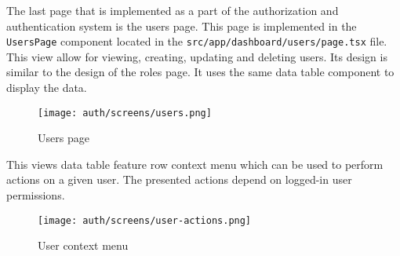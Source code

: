 \documentclass[../main.tex]{subfiles}
\begin{document}
The last page that is implemented as a part of the authorization and authentication system is the users page.
This page is implemented in the \texttt{UsersPage} component located in the \texttt{src/app/dashboard/users/page.tsx} file.
This view allow for viewing, creating, updating and deleting users.
Its design is similar to the design of the roles page. It uses the same data table component to display the data.

\begin{figure}[H]
  \centering
  \texttt{[image: auth/screens/users.png]}
  \caption{Users page}
\end{figure}

This views data table feature row context menu which can be used to perform actions on a given user.
The presented actions depend on logged-in user permissions.

\begin{figure}[H]
  \centering
  \texttt{[image: auth/screens/user-actions.png]}
  \caption{User context menu}
\end{figure}
\end{document}
